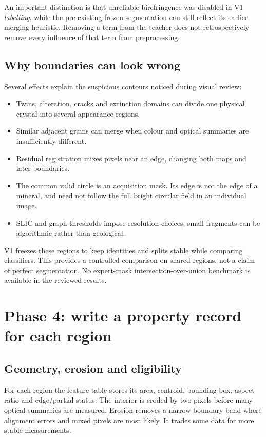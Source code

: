 An important distinction is that unreliable birefringence was disabled in V1 \emph{labelling}, while the pre-existing frozen segmentation can still reflect its earlier merging heuristic. Removing a term from the teacher does not retrospectively remove every influence of that term from preprocessing.

\subsection{Why boundaries can look wrong}
Several effects explain the suspicious contours noticed during visual review:
\begin{itemize}
\item Twins, alteration, cracks and extinction domains can divide one physical crystal into several appearance regions.
\item Similar adjacent grains can merge when colour and optical summaries are insufficiently different.
\item Residual registration mixes pixels near an edge, changing both maps and later boundaries.
\item The common valid circle is an acquisition mask. Its edge is not the edge of a mineral, and need not follow the full bright circular field in an individual image.
\item SLIC and graph thresholds impose resolution choices; small fragments can be algorithmic rather than geological.
\end{itemize}
V1 freezes these regions to keep identities and splits stable while comparing classifiers. This provides a controlled comparison on shared regions, not a claim of perfect segmentation. No expert-mask intersection-over-union benchmark is available in the reviewed results.

\FloatBarrier

\section{Phase 4: write a property record for each region}
\subsection{Geometry, erosion and eligibility}
For each region the feature table stores its area, centroid, bounding box, aspect ratio and edge/partial status. The interior is eroded by two pixels before many optical summaries are measured. Erosion removes a narrow boundary band where alignment errors and mixed pixels are most likely. It trades some data for more stable measurements.

